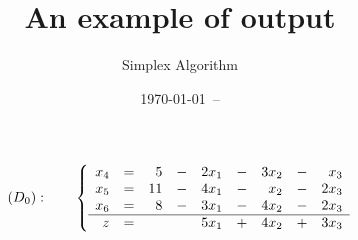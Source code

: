 \documentclass{article}
\title{An example of output}
\author{Simplex Algorithm}
\date{\today ~-- \currenttime}
\begin{document}
\maketitle

\[
    (D_0):\qquad \left \{
    \begin{array}{rcr*3{cr}}
        x_4 & = & 5 & - & 2x_1 & - & 3x_2 & - & x_3\\
        x_5 & = & 11 & - & 4x_1 & - & x_2 & - & 2x_3\\
        x_6 & = & 8 & - & 3x_1 & - & 4x_2 & - & 2x_3\\
		\hline
        z & = &  &  & 5x_1 & + & 4x_2 & + & 3x_3
    \end{array} \right.
\]
\end{document}
